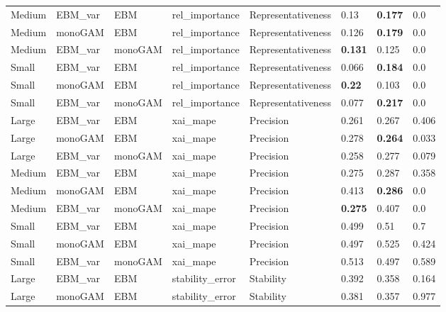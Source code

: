 \begin{table}[]
{\begin{tabular}{@{}llllllll@{}}
Medium & EBM\_var & EBM     & rel\_importance   & Representativeness & 0.13           & \textbf{0.177} & 0.0   \\
Medium & monoGAM        & EBM     & rel\_importance   & Representativeness & 0.126          & \textbf{0.179} & 0.0   \\
Medium & EBM\_var & monoGAM & rel\_importance   & Representativeness & \textbf{0.131} & 0.125          & 0.0   \\
Small  & EBM\_var & EBM     & rel\_importance   & Representativeness & 0.066          & \textbf{0.184} & 0.0   \\
Small  & monoGAM        & EBM     & rel\_importance   & Representativeness & \textbf{0.22}  & 0.103          & 0.0   \\
Small  & EBM\_var & monoGAM & rel\_importance   & Representativeness & 0.077          & \textbf{0.217} & 0.0   \\
Large  & EBM\_var & EBM     & xai\_mape         & Precision          & 0.261          & 0.267          & 0.406 \\
Large  & monoGAM        & EBM     & xai\_mape         & Precision          & 0.278          & \textbf{0.264} & 0.033 \\
Large  & EBM\_var & monoGAM & xai\_mape         & Precision          & 0.258 & 0.277          & 0.079 \\
Medium & EBM\_var & EBM     & xai\_mape         & Precision          & 0.275          & 0.287          & 0.358 \\
Medium & monoGAM        & EBM     & xai\_mape         & Precision          & 0.413          & \textbf{0.286} & 0.0   \\
Medium & EBM\_var & monoGAM & xai\_mape         & Precision          & \textbf{0.275} & 0.407          & 0.0   \\
Small  & EBM\_var & EBM     & xai\_mape         & Precision          & 0.499          & 0.51           & 0.7   \\
Small  & monoGAM        & EBM     & xai\_mape         & Precision          & 0.497          & 0.525          & 0.424 \\
Small  & EBM\_var & monoGAM & xai\_mape         & Precision          & 0.513          & 0.497          & 0.589 \\
Large  & EBM\_var & EBM     & stability\_error  & Stability          & 0.392          & 0.358          & 0.164 \\
Large  & monoGAM        & EBM     & stability\_error  & Stability          & 0.381          & 0.357          & 0.977 \\

\end{tabular}}
\end{table}
